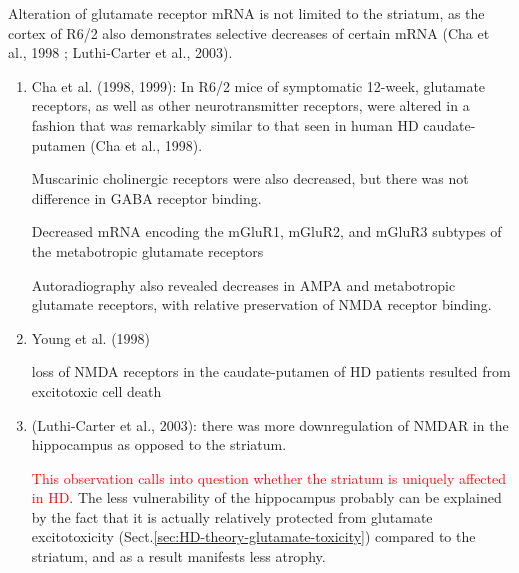 Alteration of glutamate receptor mRNA is not limited to the striatum, as the
cortex of R6/2 also demonstrates selective decreases of certain mRNA (Cha et
al., 1998 ;  Luthi-Carter et al., 2003). 


\begin{enumerate}
  
  \item Cha et al. (1998, 1999): In R6/2 mice of symptomatic 12-week,
  glutamate receptors, as well as other neurotransmitter receptors, were altered
  in a fashion that was remarkably similar to that seen in human HD
  caudate-putamen (Cha et al., 1998). 
  
    Muscarinic cholinergic receptors were also decreased,  but there was not
  difference in GABA receptor binding. 

   Decreased mRNA encoding the mGluR1, mGluR2, and mGluR3 subtypes of the
 metabotropic glutamate receptors 
  
  

  Autoradiography also revealed decreases in AMPA and metabotropic glutamate
  receptors, with relative preservation of NMDA receptor binding.
   
  
  \item Young et al. (1998)
  
  loss of NMDA receptors in the caudate-putamen of HD patients resulted from
  excitotoxic cell death
  

  \item (Luthi-Carter et al., 2003): there was more downregulation of NMDAR in
  the hippocampus as opposed to the striatum.
  
 \textcolor{red}{This observation calls into question whether the striatum is
 uniquely affected in HD}. The less vulnerability of the hippocampus probably
 can be explained by the fact that it is actually relatively protected from
 glutamate excitotoxicity (Sect.\ref{sec:HD-theory-glutamate-toxicity}) compared
 to the striatum, and as a result manifests less atrophy.
 

\end{enumerate}
